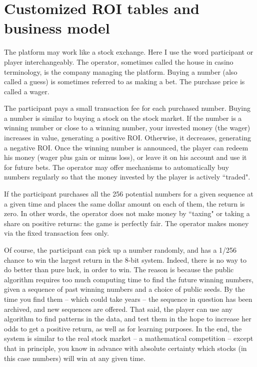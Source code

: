 \documentclass[oneside,10pt]{book}
\begin{document}
\section{Customized ROI tables and business model}

The platform may work like a stock exchange. Here I use the word participant or player interchangeably. The operator, sometimes called the house in casino terminology, is the company managing the platform. Buying a number (also called a guess) is sometimes referred to as making a bet. The purchase price is called a wager.

The participant pays a small transaction fee for each purchased number. Buying a number is similar to buying a stock on the stock market. If the number is a winning number or close to a winning number, your invested money (the wager) increases in value, generating a positive ROI. Otherwise, it decreases, generating a negative ROI. Once the winning number is announced, the player can redeem his money (wager plus gain or minus loss), or leave it on his account and use it for future bets. The operator may offer mechanisms to automatically buy numbers regularly so that the money invested by the player is actively ``traded".


If the participant purchases all the 256 potential numbers for a given sequence at a given time and places the same dollar amount on each of them, the return is zero. In other words, the operator does not make money by ``taxing" or taking a share on positive returns: the game is perfectly fair. The operator makes money via the fixed transaction fees only. 

Of course, the participant can pick up a number randomly, and has a 1/256 chance to win the largest return in the 8-bit system. Indeed, there is no way to do better than pure luck, in order to win. The reason is because the public algorithm requires too much computing time to find the future winning numbers, given a sequence of past winning numbers and a choice of public seeds. By the time you find them -- which could take years -- the sequence in question has been archived, and new sequences are offered. That said, the player can use any algorithm to find patterns in the data, and test them in the hope to increase her odds to get a positive return, as well as for learning purposes. In the end, the system is similar to the real stock market -- a mathematical competition -- except
 that in principle, you know in advance with absolute certainty which stocks  (in this case numbers)  will win at any given time.
\end{document}
